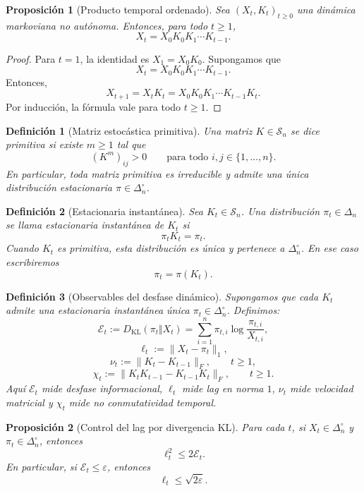 \documentclass[12pt]{article}
\newtheorem{definicion}{Definición}[section]
\newtheorem{proposicion}{Proposición}[section]
\begin{document}
\begin{proposicion}[Producto temporal ordenado]
Sea \((X_t,K_t)_{t\geq 0}\) una dinámica markoviana no autónoma. Entonces,
para todo \(t\geq 1\),
\[
X_t=X_0K_0K_1\cdots K_{t-1}.
\]
\end{proposicion}

\begin{proof}
Para \(t=1\), la identidad es \(X_1=X_0K_0\). Supongamos que
\[
X_t=X_0K_0K_1\cdots K_{t-1}.
\]
Entonces,
\[
X_{t+1}=X_tK_t
=
X_0K_0K_1\cdots K_{t-1}K_t.
\]
Por inducción, la fórmula vale para todo \(t\geq 1\).
\end{proof}

\begin{definicion}[Matriz estocástica primitiva]
Una matriz \(K\in\mathcal S_n\) se dice \emph{primitiva} si existe
\(m\geq 1\) tal que
\[
(K^m)_{ij}>0
\qquad
\text{para todo }i,j\in\{1,\dots,n\}.
\]
En particular, toda matriz primitiva es irreducible y admite una única
distribución estacionaria \(\pi\in\Delta_n^\circ\).
\end{definicion}



\begin{definicion}[Estacionaria instantánea]
Sea \(K_t\in\mathcal S_n\). Una distribución \(\pi_t\in\Delta_n\) se llama
estacionaria instantánea de \(K_t\) si
\[
\pi_tK_t=\pi_t.
\]
Cuando \(K_t\) es primitiva, esta distribución es única y pertenece a
\(\Delta_n^\circ\). En ese caso escribiremos
\[
\pi_t=\pi(K_t).
\]
\end{definicion}

\begin{definicion}[Observables del desfase dinámico]
Supongamos que cada \(K_t\) admite una estacionaria instantánea única
\(\pi_t\in\Delta_n^\circ\). Definimos:
\[
\mathcal E_t
:=
D_{\mathrm{KL}}(\pi_t\Vert X_t)
=
\sum_{i=1}^n \pi_{t,i}\log\frac{\pi_{t,i}}{X_{t,i}},
\]
\[
\ell_t:=\|X_t-\pi_t\|_1,
\]
\[
\nu_t:=\|K_t-K_{t-1}\|_F,
\qquad t\geq 1,
\]
\[
\chi_t:=\|K_tK_{t-1}-K_{t-1}K_t\|_F,
\qquad t\geq 1.
\]
Aquí \(\mathcal E_t\) mide desfase informacional, \(\ell_t\) mide lag en norma
\(1\), \(\nu_t\) mide velocidad matricial y \(\chi_t\) mide no conmutatividad
temporal.
\end{definicion}

\begin{proposicion}[Control del lag por divergencia KL]
Para cada \(t\), si \(X_t\in\Delta_n^\circ\) y \(\pi_t\in\Delta_n^\circ\),
entonces
\[
\ell_t^2
\leq
2\mathcal E_t.
\]
En particular, si \(\mathcal E_t\leq\varepsilon\), entonces
\[
\ell_t\leq \sqrt{2\varepsilon}.
\]
\end{proposicion}
\end{document}
